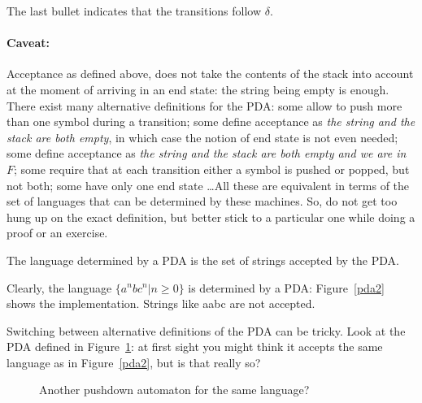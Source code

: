 The last bullet indicates that the transitions follow $\delta$.

\paragraph{Caveat:}

Acceptance as defined above, does not take the contents of the stack
into account at the moment of arriving in an end state: the string
being empty is enough. There exist many alternative definitions for
the PDA: some allow to push more than one symbol during a transition;
some define acceptance as {\em the string and the stack are both
  empty}, in which case the notion of end state is not even needed;
some define acceptance as {\em the string and the stack are both empty
  and we are in $F$}; some require that at each transition either a
symbol is pushed or popped, but not both; some have only one end state
\ldots All these are equivalent in terms of the set of languages that can
be determined by these machines. So, do not get too hung up on the
exact definition, but better stick to a particular one while doing a
proof or an exercise.


\begin{definition}
The language determined by a PDA is the set of strings accepted by the
PDA.
\end{definition}

Clearly, the language $\{a^nbc^n|n \geq 0\}$ is determined by a PDA:
Figure~\ref{pda2} shows the implementation. Strings like aabc are not
accepted.


Switching between alternative definitions of the PDA can be
tricky. Look at the PDA defined in Figure~\ref{pda1}: at first sight
you might think it accepts the same language as in Figure~\ref{pda2},
but is that really so?

\begin{figure}[h]
\caption{Another pushdown automaton for the same language?\label{pda1}}
\end{figure}

